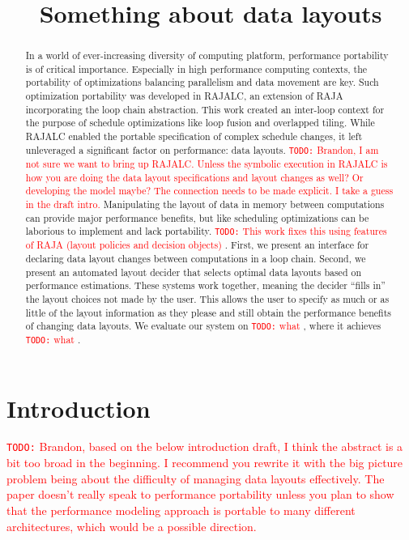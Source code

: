\documentclass[sigconf, table]{acmart}
\title{Something about data layouts}
\newcommand{\todo}[1]{{\textcolor{red}{{\tt{TODO:}}\,\,#1 }}}
\begin{document}
\begin{abstract}
In a world of ever-increasing diversity of computing platform, performance portability is of critical importance. 
Especially in high performance computing contexts, the portability of optimizations balancing parallelism and data movement are key. 
Such optimization portability was developed in RAJALC, an extension of RAJA incorporating the loop chain abstraction.
This work created an inter-loop context for the purpose of schedule optimizations like loop fusion and overlapped tiling.
While RAJALC enabled the portable specification of complex schedule changes, it left unleveraged a significant factor on performance: data layouts.
\todo{Brandon, I am not sure we want to bring up RAJALC.  Unless the symbolic execution in RAJALC is how you
are doing the data layout specifications and layout changes as well?  Or developing the model maybe?  The
connection needs to be made explicit.  I take a guess in the draft intro.}
Manipulating the layout of data in memory between computations can provide major performance benefits, but like scheduling optimizations can be laborious to implement and lack portability. 
\todo{This work fixes this using features of RAJA (layout policies and decision objects)}.
First, we present an interface for declaring data layout changes between computations in a loop chain. 
Second, we present an automated layout decider that selects optimal data layouts based on performance estimations.
These systems work together, meaning the decider \enquote{fills in} the layout choices not made by the user.
This allows the user to specify as much or as little of the layout information as they please and still obtain the performance benefits of changing data layouts.  
We evaluate our system on \todo{what}, where it achieves \todo{what}.
\end{abstract}

\maketitle

\section{Introduction}
\todo{Brandon, based on the below introduction draft, I think the abstract is a bit too broad in the beginning.
I recommend you rewrite it with the big picture problem being about the difficulty of managing data layouts
effectively.  The paper doesn't really speak to performance portability unless you plan to show that the
performance modeling approach is portable to many different architectures, which would be a possible
direction.}
\end{document}
